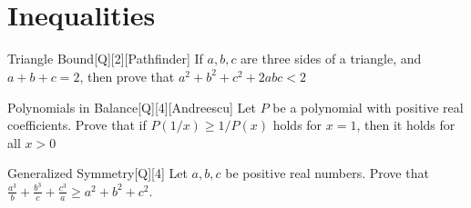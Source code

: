 




\sloppy
\maketitle

\begin{center}
    \begin{minipage}{0.8\textwidth} 
        \small 
        \setlength{\parindent}{0.3in}
        \lipsum[2] %
    \end{minipage}
\end{center}

\vspace{2em} 


\setlength{\parindent}{0.3in} \lipsum[3] \\ %
\setlength{\parindent}{0.3in} \lipsum[2] \\

\newpage
\thispagestyle{firstpageheader}

\section{Inequalities}

\begin{problem}{Triangle Bound}[Q][2][Pathfinder]
    If $a,b,c$ are three sides of a triangle, and $a+b+c=2$, then prove that $a^2+b^2+c^2+2abc<2$
\end{problem}

\begin{problem}{Polynomials in Balance}[Q][4][Andreescu]
    Let $P$ be a polynomial with positive real coefficients. Prove that if $P(1/x) \geq 1/P(x)$ holds for $x=1$, then it holds for all $x>0$
\end{problem}

\begin{problem}{Generalized Symmetry}[Q][4]
    Let $a,b,c$ be positive real numbers. Prove that $\frac{a^3}{b}+\frac{b^3}{c}+\frac{c^3}{a} \geq a^2+b^2+c^2$.
\end{problem}

